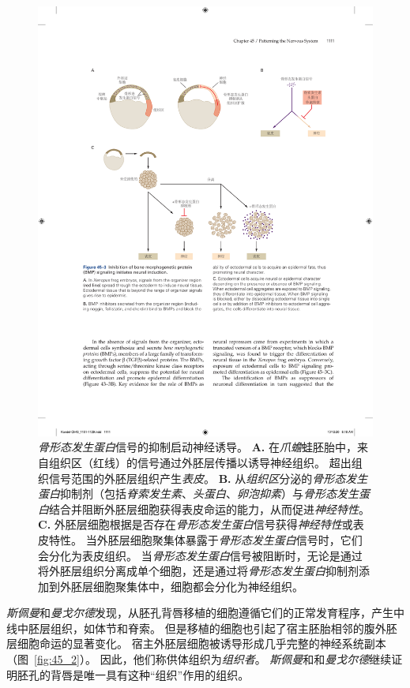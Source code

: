 \begin{figure}[htbp]
	\centering
	\includegraphics[width=1.0\linewidth]{chap45/fig_45_3}
	\caption{\textit{骨形态发生蛋白}信号的抑制启动神经诱导。
		\textbf{A.} 在\textit{爪蟾}蛙胚胎中，来自组织区（红线）的信号通过外胚层传播以诱导神经组织。
		超出组织信号范围的外胚层组织产生\textit{表皮}。
		\textbf{B.} 从\textit{组织区}分泌的\textit{骨形态发生蛋白}抑制剂（包括\textit{脊索发生素}、\textit{头蛋白}、\textit{卵泡抑素}）与\textit{骨形态发生蛋白}结合并阻断外胚层细胞获得表皮命运的能力，从而促进\textit{神经特性}。
		\textbf{C.} 外胚层细胞根据是否存在\textit{骨形态发生蛋白}信号获得\textit{神经特性}或表皮特性。
		当外胚层细胞聚集体暴露于\textit{骨形态发生蛋白}信号时，它们会分化为表皮组织。
		当\textit{骨形态发生蛋白}信号被阻断时，无论是通过将外胚层组织分离成单个细胞，还是通过将\textit{骨形态发生蛋白}抑制剂添加到外胚层细胞聚集体中，细胞都会分化为神经组织。}
	\label{fig:45_3}
\end{figure}


\textit{斯佩曼}和\textit{曼戈尔德}发现，从胚孔背唇移植的细胞遵循它们的正常发育程序，产生中线中胚层组织，如体节和脊索。
但是移植的细胞也引起了宿主胚胎相邻的腹外胚层细胞命运的显著变化。
宿主外胚层细胞被诱导形成几乎完整的神经系统副本（图~\ref{fig:45_2}）。
因此，他们称供体组织为\textit{组织者}。
\textit{斯佩曼}和和\textit{曼戈尔德}继续证明胚孔的背唇是唯一具有这种“组织”作用的组织。


